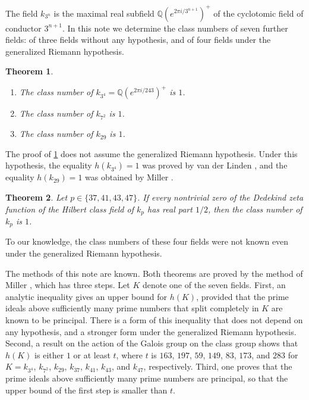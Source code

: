 \documentclass[11pt]{amsart}
\theoremstyle{plain}
\newtheorem{theorem}{Theorem}[section]
\theoremstyle{definition}
\begin{document}
The field $k_{3^n}$ is the maximal real subfield $\mathbb{Q}(e^{2\pi i/3^{n+1}})^+$ of the cyclotomic field of conductor $3^{n+1}$.
In this note we determine the class numbers of seven further fields: of three fields without any hypothesis, and of four fields under the generalized Riemann hypothesis.

\begin{theorem} \label{thm:main}
\begin{enumerate}
\item The class number of $k_{3^4} = \mathbb{Q}(e^{2\pi i/243})^+$ is $1$.
\item The class number of $k_{7^2}$ is $1$.
\item The class number of $k_{29}$ is $1$.
\end{enumerate}
\end{theorem}

The proof of \cref{thm:main} does not assume the generalized Riemann hypothesis.
Under this hypothesis, the equality $h(k_{3^4}) = 1$ was proved by van der Linden \cite[Theorem 2]{vdL82}, and the equality $h(k_{29}) = 1$ was obtained by Miller \cite[Table 2]{Mi15b}.

\begin{theorem} \label{thm:grh}
Let $p \in \{37, 41, 43, 47\}$.
If every nontrivial zero of the Dedekind zeta function of the Hilbert class field of $k_p$ has real part $1/2$, then the class number of $k_p$ is $1$.
\end{theorem}

To our knowledge, the class numbers of these four fields were not known even under the generalized Riemann hypothesis.

The methods of this note are known.
Both theorems are proved by the method of Miller \cite{Mi14, Mi15b}, which has three steps.
Let $K$ denote one of the seven fields.
First, an analytic inequality gives an upper bound for $h(K)$, provided that the prime ideals above sufficiently many prime numbers that split completely in $K$ are known to be principal.
There is a form of this inequality that does not depend on any hypothesis, and a stronger form under the generalized Riemann hypothesis.
Second, a result on the action of the Galois group on the class group shows that $h(K)$ is either $1$ or at least $t$, where $t$ is $163$, $197$, $59$, $149$, $83$, $173$, and $283$ for $K = k_{3^4}$, $k_{7^2}$, $k_{29}$, $k_{37}$, $k_{41}$, $k_{43}$, and $k_{47}$, respectively.
Third, one proves that the prime ideals above sufficiently many prime numbers are principal, so that the upper bound of the first step is smaller than $t$.
\end{document}
